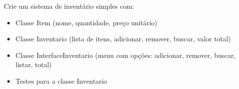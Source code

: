 \documentclass[11pt,a4paper]{article}
\renewcommand{\texttt}[1]{{\color{javaCodeInline}\small\ttfamily #1}}
\begin{document}
Crie um sistema de inventário simples com:
\begin{itemize}
\item Classe \texttt{Item} (nome, quantidade, preço unitário)
\item Classe \texttt{Inventario} (lista de itens, adicionar, remover, buscar, valor total)
\item Classe \texttt{InterfaceInventario} (menu com opções: adicionar, remover, buscar, listar, total)
\item Testes para a classe \texttt{Inventario}
\end{itemize}
\end{document}
